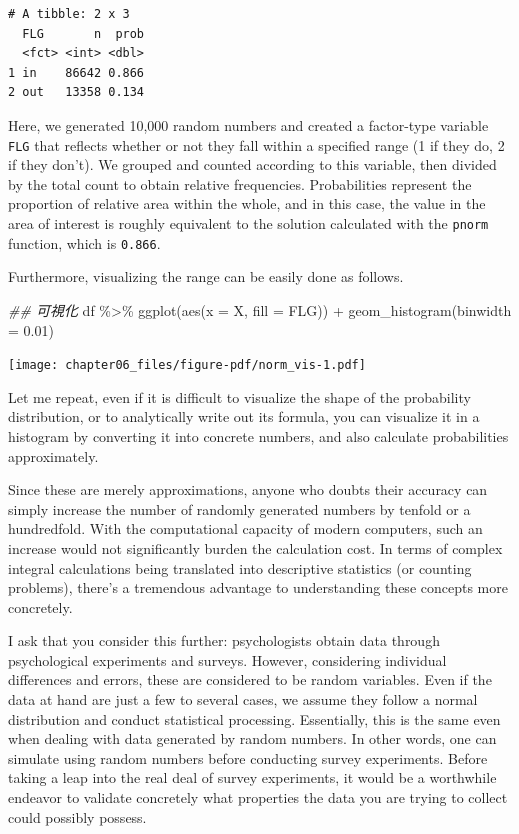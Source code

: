 \documentclass[
  a4paper,
]{book}
\newenvironment{Shaded}{\begin{snugshade}}{\end{snugshade}}
\newcommand{\AttributeTok}[1]{\textcolor[rgb]{0.40,0.45,0.13}{#1}}
\newcommand{\DocumentationTok}[1]{\textcolor[rgb]{0.37,0.37,0.37}{\textit{#1}}}
\newcommand{\FloatTok}[1]{\textcolor[rgb]{0.68,0.00,0.00}{#1}}
\newcommand{\FunctionTok}[1]{\textcolor[rgb]{0.28,0.35,0.67}{#1}}
\newcommand{\NormalTok}[1]{\textcolor[rgb]{0.00,0.23,0.31}{#1}}
\newcommand{\SpecialCharTok}[1]{\textcolor[rgb]{0.37,0.37,0.37}{#1}}
\begin{document}
\begin{verbatim}
# A tibble: 2 x 3
  FLG       n  prob
  <fct> <int> <dbl>
1 in    86642 0.866
2 out   13358 0.134
\end{verbatim}

Here, we generated 10,000 random numbers and created a factor-type
variable \texttt{FLG} that reflects whether or not they fall within a
specified range (1 if they do, 2 if they don't). We grouped and counted
according to this variable, then divided by the total count to obtain
relative frequencies. Probabilities represent the proportion of relative
area within the whole, and in this case, the value in the area of
interest is roughly equivalent to the solution calculated with the
\texttt{pnorm} function, which is \texttt{0.866}.

Furthermore, visualizing the range can be easily done as follows.

\begin{Shaded}
\begin{Highlighting}[]
\DocumentationTok{\#\# 可視化}
\NormalTok{df }\SpecialCharTok{\%\textgreater{}\%}
  \FunctionTok{ggplot}\NormalTok{(}\FunctionTok{aes}\NormalTok{(}\AttributeTok{x =}\NormalTok{ X, }\AttributeTok{fill =}\NormalTok{ FLG)) }\SpecialCharTok{+}
  \FunctionTok{geom\_histogram}\NormalTok{(}\AttributeTok{binwidth =} \FloatTok{0.01}\NormalTok{)}
\end{Highlighting}
\end{Shaded}

\texttt{[image: chapter06\_files/figure-pdf/norm\_vis-1.pdf]}

Let me repeat, even if it is difficult to visualize the shape of the
probability distribution, or to analytically write out its formula, you
can visualize it in a histogram by converting it into concrete numbers,
and also calculate probabilities approximately.

Since these are merely approximations, anyone who doubts their accuracy
can simply increase the number of randomly generated numbers by tenfold
or a hundredfold. With the computational capacity of modern computers,
such an increase would not significantly burden the calculation cost. In
terms of complex integral calculations being translated into descriptive
statistics (or counting problems), there's a tremendous advantage to
understanding these concepts more concretely.

I ask that you consider this further: psychologists obtain data through
psychological experiments and surveys. However, considering individual
differences and errors, these are considered to be random variables.
Even if the data at hand are just a few to several cases, we assume they
follow a normal distribution and conduct statistical processing.
Essentially, this is the same even when dealing with data generated by
random numbers. In other words, one can simulate using random numbers
before conducting survey experiments. Before taking a leap into the real
deal of survey experiments, it would be a worthwhile endeavor to
validate concretely what properties the data you are trying to collect
could possibly possess.
\end{document}
